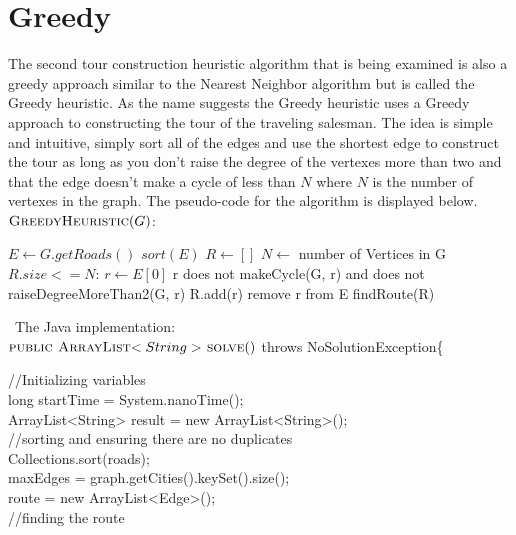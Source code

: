 \documentclass[midd]{thesis}
\newcommand{\tab}{\hspace*{2em}}
\begin{document}
\section{Greedy}
\tab The second tour construction heuristic algorithm that is being examined is also a greedy approach similar to the Nearest Neighbor algorithm but is called the Greedy heuristic. As the name suggests the Greedy heuristic uses a Greedy approach to constructing the tour of the traveling salesman. The idea is simple and intuitive, simply sort all of the edges and use the shortest edge to construct the tour as long as you don't raise the degree of the vertexes more than two and that the edge doesn't make a cycle of less than $N$ where $N$ is the number of vertexes in the graph. The pseudo-code for the algorithm is displayed below.\\
$\textnormal{\scshape GreedyHeuristic}(G)$:
\begin{codebox}
\li $E \gets G.getRoads()$
\li $sort(E)$
\li $R \gets []$
\li $N \gets$ number of Vertices in G
\li\While $R.size <= N$:
\li $r \gets E[0]$
\li \If r does not makeCycle(G, r) and does not raiseDegreeMoreThan2(G, r)
\li R.add(r) \End 
\li remove r from E \End
\li\Return findRoute(R)
\end{codebox}\
The Java implementation:\\
$\textnormal{\scshape public ArrayList$<String>$ solve}()$ throws NoSolutionException\{
\begin{codebox}
\tab//Initializing variables\\
\tab long startTime = System.nanoTime();\\	
\tab ArrayList<String> result = new ArrayList<String>();\\
\tab//sorting and ensuring there are no duplicates\\
\tab Collections.sort(roads);\\
\tab maxEdges = graph.getCities().keySet().size();\\
\tab route = new ArrayList<Edge>();\\
\tab//finding the route\\
\end{codebox}
\end{document}
